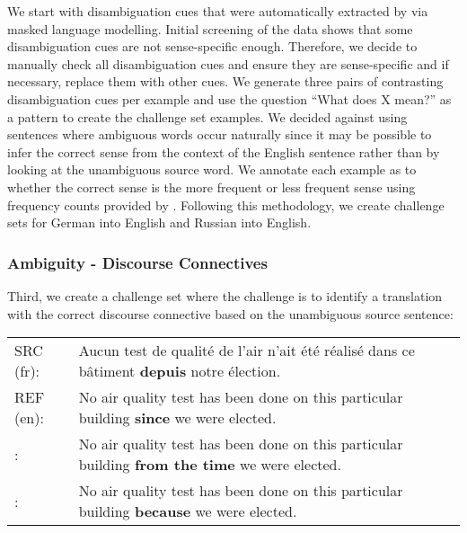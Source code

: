 \documentclass[11pt]{article}
\newcommand{\cmark}{\textcolor{darkpastelgreen}{\ding{51}}}\newcommand{\xmark}{\textcolor{darkpastelred}{\ding{55}}}
\begin{document}
We start with disambiguation cues that were automatically extracted by \citet{vamvas-sennrich-2021-contrastive} via masked language modelling. Initial screening of the data shows that some disambiguation cues are not sense-specific enough. Therefore, we decide to manually check all disambiguation cues and ensure they are sense-specific and if necessary, replace them with other cues. We generate three pairs of contrasting disambiguation cues per example and use the question ``What does X mean?'' as a pattern to create the challenge set examples. We decided against using sentences where ambiguous words occur naturally since it may be possible to infer the correct sense from the context of the English sentence rather than by looking at the unambiguous source word. We annotate each example as to whether the correct sense is the more frequent or less frequent sense using frequency counts provided by \citet{vamvas-sennrich-2021-contrastive}.
Following this methodology, we create challenge sets for German into English and Russian into English.

\subsubsection{Ambiguity - Discourse Connectives}
\label{subsec:discourse_connectives}
Third, we create a challenge set where the challenge is to identify a translation with the correct discourse connective based on the unambiguous source sentence:

\begin{small}
\vspace{0.5cm}
\setlength{\extrarowheight}{0.1cm}
\begin{tabularx}{0.95\columnwidth}{lX}
     SRC (fr): & Aucun test de qualité de l'air n'ait été réalisé dans ce bâtiment \textbf{depuis} notre élection. \\
     REF (en): & No air quality test has been done on this particular building \textbf{since} we were elected. \\
     \cmark: & No air quality test has been done on this particular building \textbf{from the time} we were elected. \\
     \xmark: & No air quality test has been done on this particular building \textbf{because} we were elected. \vspace{0.35cm}
\end{tabularx}
\end{small}
\end{document}
